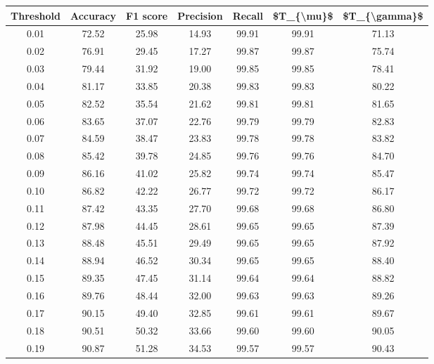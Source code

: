 \begin{tabular}{|c|c|c|c|c|c|c|}
\toprule
 Threshold &  Accuracy &  F1 score &  Precision &  Recall &  \$T\_\{\textbackslash mu\}\$ &  \$T\_\{\textbackslash gamma\}\$ \\
\hline
      0.01 &     72.52 &     25.98 &      14.93 &   99.91 &      99.91 &         71.13 \\
      0.02 &     76.91 &     29.45 &      17.27 &   99.87 &      99.87 &         75.74 \\
      0.03 &     79.44 &     31.92 &      19.00 &   99.85 &      99.85 &         78.41 \\
      0.04 &     81.17 &     33.85 &      20.38 &   99.83 &      99.83 &         80.22 \\
      0.05 &     82.52 &     35.54 &      21.62 &   99.81 &      99.81 &         81.65 \\
      0.06 &     83.65 &     37.07 &      22.76 &   99.79 &      99.79 &         82.83 \\
      0.07 &     84.59 &     38.47 &      23.83 &   99.78 &      99.78 &         83.82 \\
      0.08 &     85.42 &     39.78 &      24.85 &   99.76 &      99.76 &         84.70 \\
      0.09 &     86.16 &     41.02 &      25.82 &   99.74 &      99.74 &         85.47 \\
      0.10 &     86.82 &     42.22 &      26.77 &   99.72 &      99.72 &         86.17 \\
      0.11 &     87.42 &     43.35 &      27.70 &   99.68 &      99.68 &         86.80 \\
      0.12 &     87.98 &     44.45 &      28.61 &   99.65 &      99.65 &         87.39 \\
      0.13 &     88.48 &     45.51 &      29.49 &   99.65 &      99.65 &         87.92 \\
      0.14 &     88.94 &     46.52 &      30.34 &   99.65 &      99.65 &         88.40 \\
      0.15 &     89.35 &     47.45 &      31.14 &   99.64 &      99.64 &         88.82 \\
      0.16 &     89.76 &     48.44 &      32.00 &   99.63 &      99.63 &         89.26 \\
      0.17 &     90.15 &     49.40 &      32.85 &   99.61 &      99.61 &         89.67 \\
      0.18 &     90.51 &     50.32 &      33.66 &   99.60 &      99.60 &         90.05 \\
      0.19 &     90.87 &     51.28 &      34.53 &   99.57 &      99.57 &         90.43 \\

\end{tabular}
